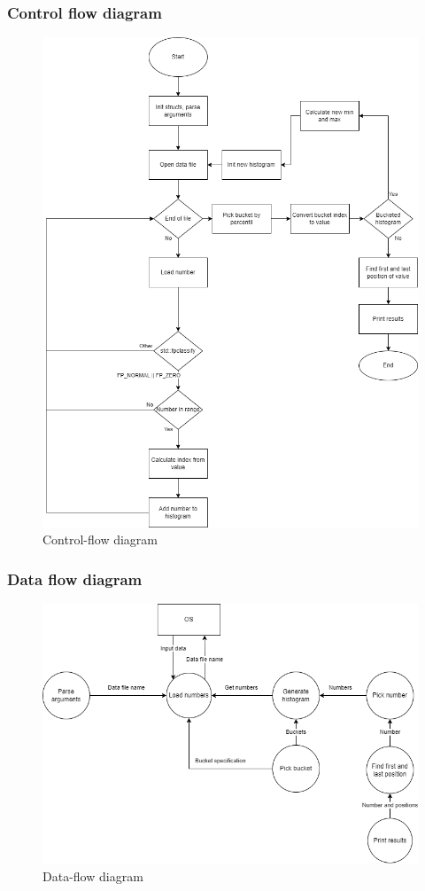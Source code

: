 \documentclass[12pt, a4paper]{article}
\begin{document}
\newpage
\subsubsection{Control flow diagram}
\begin{figure}[!h]
\centering
\includegraphics[width=14cm]{img/control_flow}
\caption{Control-flow diagram}
\label{fig:controlflow}
\end{figure}
\newpage

\subsubsection{Data flow diagram}
\begin{figure}[!h]
\centering
\includegraphics[width=14cm]{img/data_flow}
\caption{Data-flow diagram}
\label{fig:dataflow}
\end{figure}
\newpage
\end{document}
